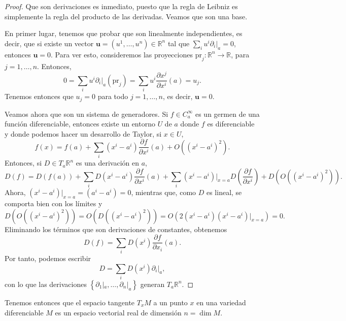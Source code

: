 \documentclass[12pt,a4paper]{book}
\theoremstyle{definition} \newtheorem{defn}[thm]{Definición}
\theoremstyle{definition} \newtheorem{ejemplo}[thm]{Ejemplo}
\theoremstyle{definition} \newtheorem{ejercicio}[thm]{Ejercicio}
\theoremstyle{remark} \newtheorem*{obs}{Observación}
\def\RR{\mathbb{R}}
\def\pr{\mathrm{pr}}
\newcommand{\ve}[1]{\mathbf{#1}}
\begin{document}
	      \begin{proof}
		Que son derivaciones es inmediato, puesto que la regla de Leibniz es simplemente la regla del producto de las derivadas. Veamos que son una base. 

		En primer lugar, tenemos que probar que son linealmente independientes, es decir, que si existe un vector $\ve{u}=(u^1,\dots,u^n)\in \RR^n$ tal que $\sum_i u^i \partial_i|_a =0$, entonces $\ve{u}=0$. Para ver esto, consideremos las proyecciones $\pr_j: \RR^n \rightarrow \RR$, para $j=1,\dots,n$. Entonces, $$0=\sum_i u^i \partial_i|_a (\pr_j)= \sum_i u^i \frac{\partial x^j}{\partial x^i}(a)= u_j.$$ Tenemos entonces que $u_j=0$ para todo $j=1,\dots,n$, es decir, $\ve{u}=0$.

		Veamos ahora que son un sistema de generadores. Si $f\in C^\infty_a$ es un germen de una función diferenciable, entonces existe un entorno $U$ de $a$ donde $f$ es diferenciable y donde podemos hacer un desarrollo de Taylor, si $x\in U$,
		\begin{equation*}
		  f(x)=f(a)+ \sum_i (x^i - a^i)\frac{\partial f}{\partial x^i}(a) + O(( x^i-a^i )^2).
		\end{equation*}
		Entonces, si $D\in T_a \RR^n$ es una derivación en $a$,
		\begin{equation*}
		  D(f)=D(f(a))+\sum_i D(x^i-a^i) \frac{\partial f}{\partial x^i}(a) + \sum_i (x^i-a^i)|_{x=a} D\left(\frac{\partial f}{\partial x^i}\right) + D(O( (x^i-a^i)^2 )).
		\end{equation*}
		Ahora, $(x^i-a^i)|_{x=a}=(a^i-a^i)=0$, mientras que, como $D$ es lineal, se comporta bien con los límites y 
		\begin{equation*}
		  D(O( (x^i-a^i)^2))=O(D( (x^i-a^i)^2))= O(2(x^i-a^i) (x^i-a^i)|_{x=a})=0.
		\end{equation*}
		Eliminando los términos que son derivaciones de constantes, obtenemos
		\begin{equation*}
		  D(f)=\sum_i D(x^i) \frac{\partial f}{\partial x_i}(a).
		\end{equation*}
		Por tanto, podemos escribir 
		\begin{equation*}
		  D=\sum_i D(x^i) \partial_i |_a,
		\end{equation*}
		con lo que las derivaciones $\left\{ \partial_1 |_a,\dots,\partial_n|_a \right\}$ generan $T_a \RR^n$.
	      \end{proof}

	      Tenemos entonces que el espacio tangente $T_xM$ a un punto $x$ en una variedad diferenciable $M$ es un espacio vectorial real de dimensión $n=\dim M$.
\end{document}

